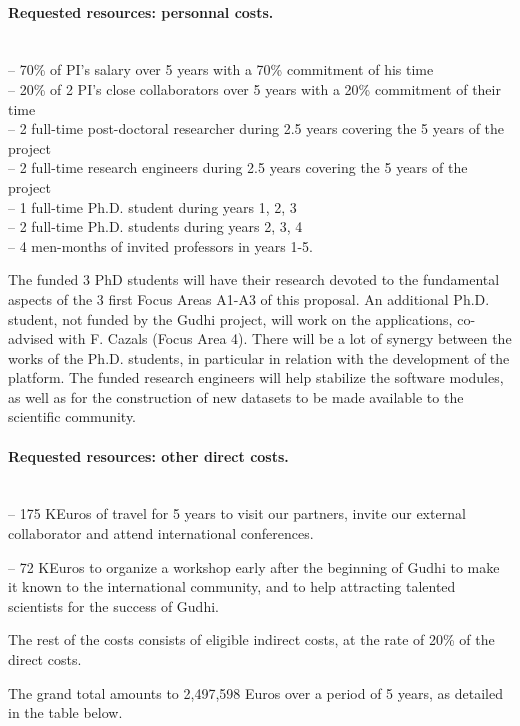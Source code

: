 \paragraph{Requested resources: personnal costs.}\mbox{}\\
-- 70\% of PI's salary over 5 years with a 70\% commitment of his time\\
-- 20\% of 2 PI's close collaborators over 5 years with a 20\% commitment of their time\\
-- 2 full-time post-doctoral researcher during 2.5 years covering the 5 years of the project\\
-- 2 full-time research engineers during 2.5 years covering the 5 years of the project\\
-- 1 full-time Ph.D. student during years 1, 2, 3\\
-- 2 full-time Ph.D. students during years 2, 3, 4\\
-- 4 men-months of invited professors in years 1-5.

The funded 3 PhD students will have their research devoted to the fundamental aspects of the 3 first Focus Areas A1-A3 of this proposal. An additional Ph.D. student, not funded by the Gudhi project, will work on the applications, co-advised with F. Cazals (Focus Area 4). There will be a lot of synergy between the works of the Ph.D. students, in particular in relation with the development of the platform. The funded research engineers will help stabilize the software modules, as well as for the construction of new datasets to be made available to the scientific community.

\paragraph{Requested resources: other direct costs.}\mbox{}\\
-- 175 KEuros of travel for 5 years to visit our partners, invite our external collaborator and attend international conferences.

-- 72 KEuros to organize a workshop early after the beginning of Gudhi to make it known to the international community, and to help attracting talented scientists for the success of Gudhi.

The rest of the costs consists of eligible indirect costs, at the rate of 20\% of the direct costs.

The grand total amounts to 2,497,598 Euros over a period of 5 years, as detailed in the table below.



